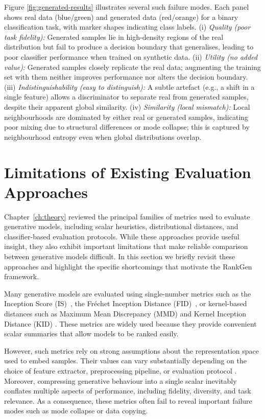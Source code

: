 Figure
\ref{fig:generated-results} illustrates several such failure modes. Each panel shows real data (blue/green) and generated data (red/orange) for a binary classification task, with marker shapes indicating class labels. (i) \emph{Quality (poor task fidelity):} Generated samples lie in high-density regions of the real distribution but fail to produce a decision boundary that generalises, leading to poor classifier performance when trained on synthetic data. (ii) \emph{Utility (no added value):} Generated samples closely replicate the real data; augmenting the training set with them neither improves performance nor alters the decision boundary. (iii) \emph{Indistinguishability (easy to distinguish):} A subtle artefact (e.g., a shift in a single feature) allows a discriminator to separate real from generated samples, despite their apparent global similarity. (iv) \emph{Similarity (local mismatch):} Local neighbourhoods are dominated by either real or generated samples, indicating poor mixing due to structural differences or mode collapse; this is captured by neighbourhood entropy even when global distributions overlap.
\section{Limitations of Existing Evaluation Approaches}
\label{sec:rankgen:limitations}

Chapter~\ref{ch:theory} reviewed the principal families of metrics used to
evaluate generative models, including scalar heuristics, distributional
distances, and classifier-based evaluation protocols. While these approaches
provide useful insight, they also exhibit important limitations that make
reliable comparison between generative models difficult. In this section we
briefly revisit these approaches and highlight the specific shortcomings that
motivate the RankGen framework.

Many generative models are evaluated using single-number metrics such as the
Inception Score (IS)~\citep{salimans2016improved}, the Fr\'echet Inception
Distance (FID)~\citep{heusel2017gans}, or kernel-based distances such as
Maximum Mean Discrepancy (MMD) and Kernel Inception Distance (KID)
\citep{gretton2012kernel,binkowski2018demystifying}. These metrics are widely
used because they provide convenient scalar summaries that allow models to be
ranked easily.

However, such metrics rely on strong assumptions about the representation space
used to embed samples. Their values can vary substantially depending on the
choice of feature extractor, preprocessing pipeline, or evaluation protocol
\citep{barratt2018note,chong2020effectively,parmar2022aliased,betzalel2022study}.
Moreover, compressing generative behaviour into a single scalar inevitably
conflates multiple aspects of performance, including fidelity, diversity, and
task relevance. As a consequence, these metrics often fail to reveal important
failure modes such as mode collapse or data copying.

